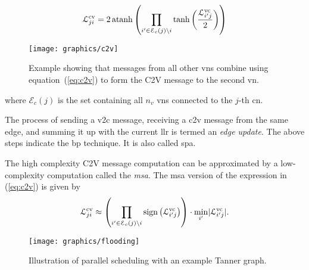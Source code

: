 \begin{itemize}
  \begin{align}\label{eq:c2v}
  \mathcal{L}^{\mathrm{cv}}_{ji}=2\operatorname{atanh}\left(\prod_{i^\prime\in\mathcal{E}_c(j)\backslash i}\tanh\left(\frac{\mathcal{L}^{\mathrm{vc}}_{i^\prime j}}{2}\right)\right)
  \end{align}
  \begin{figure}[htbp]
    \centering
    \texttt{[image: graphics/c2v]}
    \caption{Example showing that messages from all other \glspl{vn} combine using equation~(\ref{eq:c2v}) to form the C2V message to the second \gls{vn}.}
    \label{fig:c2v}
  \end{figure}
  where $\mathcal{E}_c(j)$ is the set containing all $n_v$ \glspl{vn} connected to the $j$-th \gls{cn}.
\end{itemize}
The process of sending a \gls{v2c} message, receiving a \gls{c2v} message from the same edge, and summing it up with the current \gls{llr} is termed an \emph{edge update}. The above steps indicate the \gls{bp} technique. It is also called \gls{spa}.

The high complexity C2V message computation can be approximated by a low-complexity computation called the \emph{\acrlong{msa}}. The \gls{msa} version of the expression in (\ref{eq:c2v}) is given by
\begin{align}\label{eq:msa}
\mathcal{L}^{\mathrm{cv}}_{ji}\approx\left(\prod_{i^\prime\in\mathcal{E}_c(j)\backslash i}\operatorname{sign}\left(\mathcal{L}^{\mathrm{vc}}_{i^\prime j}\right)\right)\cdot\min_{i^\prime}\lvert\mathcal{L}^{\mathrm{vc}}_{i^\prime j}\rvert.
\end{align}

\begin{figure}[htbp]
  \centering
  \texttt{[image: graphics/flooding]}
  \caption{Illustration of parallel scheduling with an example Tanner graph.}
  \label{fig:flooding}
\end{figure}

